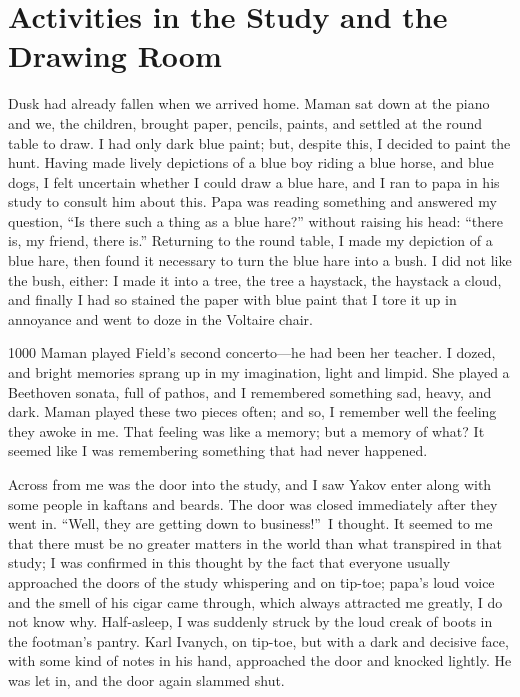 \chapter{Activities in the Study and the Drawing Room} %

Dusk had already fallen when we arrived home. Maman sat down at the piano and we, the children, brought paper, pencils, paints, and settled at the round table to draw. I had only dark blue paint; but, despite this, I decided to paint the hunt. Having made lively depictions of a blue boy riding a blue horse, and blue dogs, I felt uncertain whether I could draw a blue hare, and I ran to papa in his study to consult him about this. Papa was reading something and answered my question, ``Is there such a thing as a blue hare?'' without raising his head: ``there is, my friend, there is.'' Returning to the round table, I made my depiction of a blue hare, then found it necessary to turn the blue hare into a bush. I did not like the bush, either: I made it into a tree, the tree a haystack, the haystack a cloud, and finally I had so stained the paper with blue paint that I tore it up in annoyance and went to doze in the Voltaire chair.

\begin{tolerant}{1000}
Maman played Field's second concerto---he had been her teacher. I dozed, and bright memories sprang up in my imagination, light and limpid. She played a Beethoven sonata, full of pathos, and I remembered something sad, heavy, and dark. Maman played these two pieces often; and so, I remember well the feeling they awoke in me. That feeling was like a memory; but a memory of what? It seemed like I was remembering something that had never happened.
\end{tolerant}

 Across from me was the door into the study, and I saw Yakov enter along with some people in kaftans and beards. The door was closed immediately after they went in. ``Well, they are getting down to business!''~I thought. It seemed to me that there must be no greater matters in the world than what transpired in that study; I was confirmed in this thought by the fact that everyone usually approached the doors of the study whispering and on tip-toe; papa's loud voice and the smell of his cigar came through, which always attracted me greatly, I do not know why. Half-asleep, I was suddenly struck by the loud creak of boots in the footman's pantry. Karl Ivanych, on tip-toe, but with a dark and decisive face, with some kind of notes in his hand, approached the door and knocked lightly. He was let in, and the door again slammed shut.

